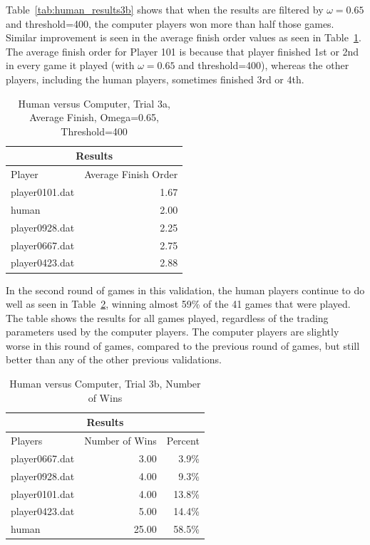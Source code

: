 Table~\ref{tab:human_results3b} shows that when the results are filtered by
\(\omega=0.65\) and threshold=400, the computer players won more than half those
games. Similar improvement is seen in the average finish order values as seen in
Table~\ref{tab:human_results3c}. The average finish order for Player 101 is
because that player finished 1st or 2nd in every game it played (with
\(\omega=0.65\) and threshold=400), whereas the other players, including the
human players, sometimes finished 3rd or 4th.

\begin{table}[htbp]
  \centering \caption[Human versus Computer, Trial 3a, Average Finish]{Human
  versus Computer, Trial 3a, Average Finish, Omega=0.65, Threshold=400}
    \begin{tabular}{lr}
    \toprule
    \multicolumn{2}{c}{Results}  \\
    \midrule
    Player & Average Finish Order \\
    \multicolumn{1}{l}{player0101.dat} & 1.67 \\
    \multicolumn{1}{l}{human} & 2.00 \\
    \multicolumn{1}{l}{player0928.dat} & 2.25 \\
    \multicolumn{1}{l}{player0667.dat} & 2.75 \\
    \multicolumn{1}{l}{player0423.dat} & 2.88 \\
    \bottomrule
    \end{tabular}%
  \label{tab:human_results3c}%
\end{table}%

In the second round of games in this validation, the human players continue to
do well as seen in Table~\ref{tab:human_results3d}, winning almost 59\% of the
41 games that were played. The table shows the results for all games played,
regardless of the trading parameters used by the computer players. The computer
players are slightly worse in this round of games, compared to the previous
round of games, but still better than any of the other previous validations.

\begin{table}[htbp]
  \centering
  \caption{Human versus Computer, Trial 3b, Number of Wins}
    \begin{tabular}{lrr}
    \toprule
    \multicolumn{3}{c}{Results}  \\
    \midrule
    Players & Number of Wins & Percent \\
    \multicolumn{1}{l}{player0667.dat} & 3.00   & 3.9\% \\
    \multicolumn{1}{l}{player0928.dat} & 4.00   & 9.3\% \\
    \multicolumn{1}{l}{player0101.dat} & 4.00   & 13.8\% \\
    \multicolumn{1}{l}{player0423.dat} & 5.00   & 14.4\% \\
    \multicolumn{1}{l}{human} & 25.00  & 58.5\% \\
    \bottomrule
    \end{tabular}%
  \label{tab:human_results3d}%
\end{table}%

